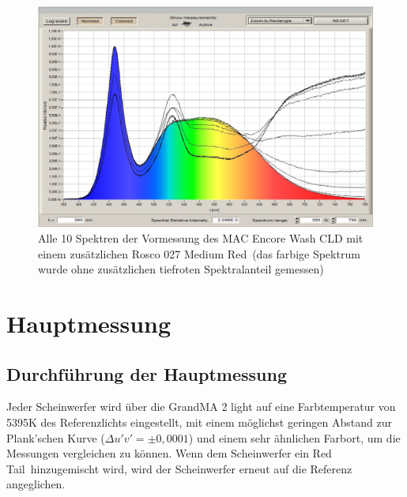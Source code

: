 \begin{figure}[H]     %
\centering
\includegraphics[width=1.0\textwidth]{bilder/encorevor1} 
\caption {Alle 10 Spektren der Vormessung des MAC Encore Wash CLD mit einem zusätzlichen  Rosco 027 \glqq Medium Red\grqq\ (das farbige Spektrum wurde ohne zusätzlichen tiefroten Spektralanteil gemessen)}\label{b_encorevor1}
\end{figure}





\section{Hauptmessung}\label{chap_hauptmessung}

\subsection{Durchführung der Hauptmessung}
Jeder Scheinwerfer wird über die GrandMA 2 light auf eine Farbtemperatur von 5395K des Referenzlichts eingestellt, mit einem möglichst geringen Abstand zur Plank'schen Kurve ($ \Delta u'v'=\pm0,0001$) und einem sehr ähnlichen Farbort, um die Messungen vergleichen zu können. Wenn dem Scheinwerfer ein \glqq Red Tail\grqq\ hinzugemischt wird, wird der Scheinwerfer erneut auf die Referenz angeglichen. 

